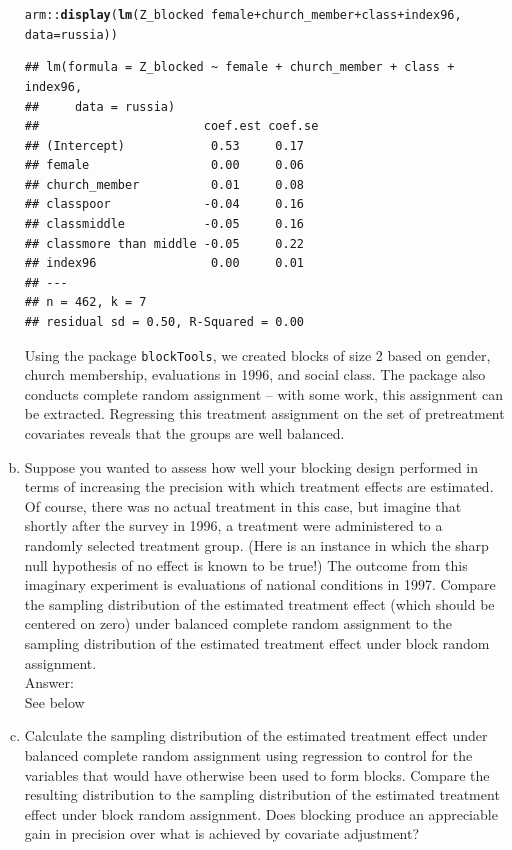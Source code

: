 \documentclass[11pt,notitlepage]{article}\usepackage[]{graphicx}\usepackage[]{color}
\makeatletter
\newcommand{\hlopt}[1]{\textcolor[rgb]{0,0,0}{#1}}%
\newcommand{\hlstd}[1]{\textcolor[rgb]{0.345,0.345,0.345}{#1}}%
\newcommand{\hlkwc}[1]{\textcolor[rgb]{0.333,0.667,0.333}{#1}}%
\newcommand{\hlkwd}[1]{\textcolor[rgb]{0.737,0.353,0.396}{\textbf{#1}}}%
\newenvironment{kframe}{%
 \def\at@end@of@kframe{}%
 \ifinner\ifhmode%
  \def\at@end@of@kframe{\end{minipage}}%
  \begin{minipage}{\columnwidth}%
 \fi\fi%
 \def\FrameCommand##1{\hskip\@totalleftmargin \hskip-\fboxsep
 \colorbox{shadecolor}{##1}\hskip-\fboxsep
     \hskip-\linewidth \hskip-\@totalleftmargin \hskip\columnwidth}%
 \MakeFramed {\advance\hsize-\width
   \@totalleftmargin\z@ \linewidth\hsize
   \@setminipage}}%
 {\par\unskip\endMakeFramed%
 \at@end@of@kframe}
\newenvironment{knitrout}{}{} %
\makeatother
\begin{document}
\begin{enumerate}[a)]
\begin{knitrout}
\begin{kframe}
\begin{alltt}
\hlstd{arm}\hlopt{::}\hlkwd{display}\hlstd{(}\hlkwd{lm}\hlstd{(Z_blocked} \hlopt{~} \hlstd{female} \hlopt{+} \hlstd{church_member} \hlopt{+} \hlstd{class} \hlopt{+} \hlstd{index96,}
                \hlkwc{data}\hlstd{=russia))}
\end{alltt}
\begin{verbatim}
## lm(formula = Z_blocked ~ female + church_member + class + index96, 
##     data = russia)
##                       coef.est coef.se
## (Intercept)            0.53     0.17  
## female                 0.00     0.06  
## church_member          0.01     0.08  
## classpoor             -0.04     0.16  
## classmiddle           -0.05     0.16  
## classmore than middle -0.05     0.22  
## index96                0.00     0.01  
## ---
## n = 462, k = 7
## residual sd = 0.50, R-Squared = 0.00
\end{verbatim}
\end{kframe}
\end{knitrout}

Using the package \texttt{blockTools}, we created blocks of size 2 based on gender, church membership, evaluations in 1996, and social class. The package also conducts complete random assignment -- with some work, this assignment can be extracted. Regressing this treatment assignment on the set of pretreatment covariates reveals that the groups are well balanced.

\item Suppose you wanted to assess how well your blocking design performed in terms of increasing the precision with which treatment effects are estimated. Of course, there was no actual treatment in this case, but imagine that shortly after the survey in 1996, a treatment were administered to a randomly selected treatment group. (Here is an instance in which the sharp null hypothesis of no effect is known to be true!) The outcome from this imaginary experiment is evaluations of national conditions in 1997. Compare the sampling distribution of the estimated treatment effect (which should be centered on zero) under balanced complete random assignment to the sampling distribution of the estimated treatment effect under block random assignment.\\
Answer:\\
See below

\item Calculate the sampling distribution of the estimated treatment effect under balanced complete random assignment using regression to control for the variables that would have otherwise been used to form blocks. Compare the resulting distribution to the sampling distribution of the estimated treatment effect under block random assignment.  Does blocking produce an appreciable gain in precision over what is achieved by covariate adjustment?  


\end{enumerate}
\end{document}

